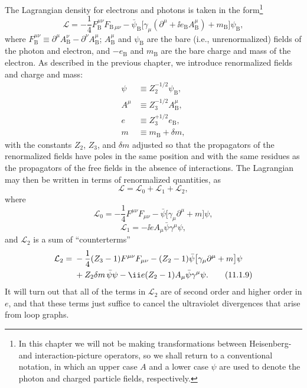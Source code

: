 The Lagrangian density for electrons and photons is taken in the form\footnote{In
this chapter we will not be making transformations between Heisenberg- and
interaction-picture operators, so we shall return to a conventional notation,
in which an upper case $A$ and a lower case $\psi$ are used to denote the
photon and charged particle fields, respectively.}
\begin{equation}
  \mathcal L=-\frac14 F_{\mathrm B}^{\mu\nu}F_{\mathrm B\,\mu\nu}
  -\bar\psi_{\mathrm B}\bigl[\gamma_\mu(\partial^\mu+\ii e_{\mathrm B}A_{\mathrm B}^{\mu})
  +m_{\mathrm B}\bigr]\psi_{\mathrm B},
  \tag{11.1.1}\label{eq:11.1.1}
\end{equation}
where $F_{\mathrm B}^{\mu\nu}\equiv\partial^\mu A_{\mathrm B}^{\nu}
-\partial^\nu A_{\mathrm B}^{\mu}$; $A_{\mathrm B}^{\mu}$ and
$\psi_{\mathrm B}$ are the bare (i.e., unrenormalized) fields of the photon
and electron, and $-e_{\mathrm B}$ and $m_{\mathrm B}$ are the bare charge and
mass of the electron. As described in the previous chapter, we introduce
renormalized fields and charge and mass:
\begin{align}
  \psi&\equiv Z_2^{-1/2}\psi_{\mathrm B},
  \tag{11.1.2}\label{eq:11.1.2}\\
  A^\mu&\equiv Z_3^{-1/2}A_{\mathrm B}^{\mu},
  \tag{11.1.3}\label{eq:11.1.3}\\
  e&\equiv Z_3^{+1/2}e_{\mathrm B},
  \tag{11.1.4}\label{eq:11.1.4}\\
  m&\equiv m_{\mathrm B}+\delta m,
  \tag{11.1.5}\label{eq:11.1.5}
\end{align}
with the constants $Z_2$, $Z_3$, and $\delta m$ adjusted so that the
propagators of the renormalized fields have poles in the same position and
with the same residues as the propagators of the free fields in the absence
of interactions. The Lagrangian may then be written in terms of renormalized
quantities, as
\begin{equation}
  \mathcal L=\mathcal L_0+\mathcal L_1+\mathcal L_2,
  \tag{11.1.6}\label{eq:11.1.6}
\end{equation}
where
\begin{equation}
  \mathcal L_0=-\frac14 F^{\mu\nu}F_{\mu\nu}
  -\bar\psi\bigl[\gamma_\mu\partial^\mu+m\bigr]\psi,
  \tag{11.1.7}\label{eq:11.1.7}
\end{equation}
\begin{equation}
  \mathcal L_1=-\ii e A_\mu\bar\psi\gamma^\mu\psi,
  \tag{11.1.8}\label{eq:11.1.8}
\end{equation}
and $\mathcal L_2$ is a sum of ``counterterms''
\begin{align}
  \mathcal L_2={}&-\frac14(Z_3-1)F^{\mu\nu}F_{\mu\nu}
  -(Z_2-1)\bar\psi\bigl[\gamma_\mu\partial^\mu+m\bigr]\psi
  \notag\\
  &+Z_2\delta m\,\bar\psi\psi
  -\ii e(Z_2-1)A_\mu\bar\psi\gamma^\mu\psi.
  \tag{11.1.9}\label{eq:11.1.9}
\end{align}
It will turn out that all of the terms in $\mathcal L_2$ are of second order
and higher order in $e$, and that these terms just suffice to cancel the
ultraviolet divergences that arise from loop graphs.
